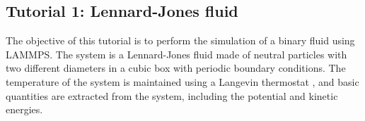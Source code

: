 \subsection{Tutorial 1: Lennard-Jones fluid}
\label{lennard-jones-label}

\noindent The objective of this tutorial is to perform the simulation of a binary fluid using LAMMPS. The system is a Lennard-Jones fluid made of neutral particles with two different diameters in a cubic box with periodic
boundary conditions. The temperature of the system is maintained
using a Langevin thermostat \cite{schneider1978molecular}, and
basic quantities are extracted from the system, including the potential and kinetic energies. 
